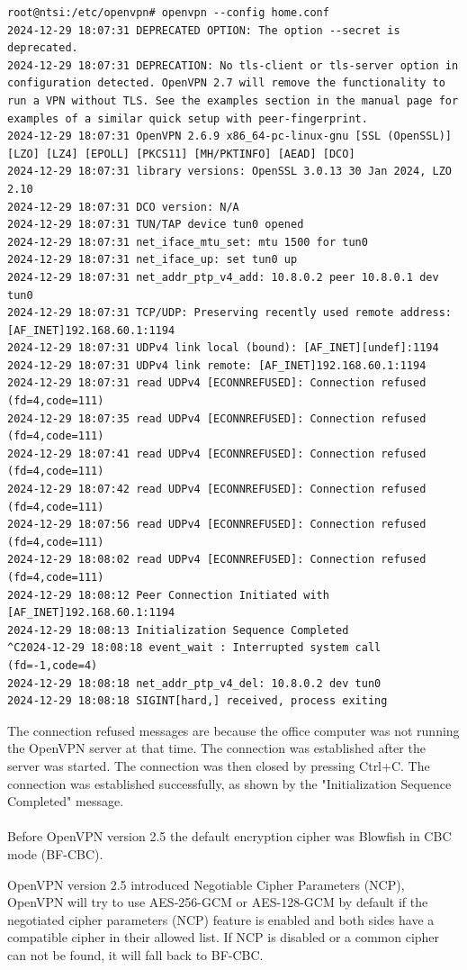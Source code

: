 \begin{verbatim}
root@ntsi:/etc/openvpn# openvpn --config home.conf
2024-12-29 18:07:31 DEPRECATED OPTION: The option --secret is deprecated.
2024-12-29 18:07:31 DEPRECATION: No tls-client or tls-server option in configuration detected. OpenVPN 2.7 will remove the functionality to run a VPN without TLS. See the examples section in the manual page for examples of a similar quick setup with peer-fingerprint.
2024-12-29 18:07:31 OpenVPN 2.6.9 x86_64-pc-linux-gnu [SSL (OpenSSL)] [LZO] [LZ4] [EPOLL] [PKCS11] [MH/PKTINFO] [AEAD] [DCO]
2024-12-29 18:07:31 library versions: OpenSSL 3.0.13 30 Jan 2024, LZO 2.10
2024-12-29 18:07:31 DCO version: N/A
2024-12-29 18:07:31 TUN/TAP device tun0 opened
2024-12-29 18:07:31 net_iface_mtu_set: mtu 1500 for tun0
2024-12-29 18:07:31 net_iface_up: set tun0 up
2024-12-29 18:07:31 net_addr_ptp_v4_add: 10.8.0.2 peer 10.8.0.1 dev tun0
2024-12-29 18:07:31 TCP/UDP: Preserving recently used remote address: [AF_INET]192.168.60.1:1194
2024-12-29 18:07:31 UDPv4 link local (bound): [AF_INET][undef]:1194
2024-12-29 18:07:31 UDPv4 link remote: [AF_INET]192.168.60.1:1194
2024-12-29 18:07:31 read UDPv4 [ECONNREFUSED]: Connection refused (fd=4,code=111)
2024-12-29 18:07:35 read UDPv4 [ECONNREFUSED]: Connection refused (fd=4,code=111)
2024-12-29 18:07:41 read UDPv4 [ECONNREFUSED]: Connection refused (fd=4,code=111)
2024-12-29 18:07:42 read UDPv4 [ECONNREFUSED]: Connection refused (fd=4,code=111)
2024-12-29 18:07:56 read UDPv4 [ECONNREFUSED]: Connection refused (fd=4,code=111)
2024-12-29 18:08:02 read UDPv4 [ECONNREFUSED]: Connection refused (fd=4,code=111)
2024-12-29 18:08:12 Peer Connection Initiated with [AF_INET]192.168.60.1:1194
2024-12-29 18:08:13 Initialization Sequence Completed
^C2024-12-29 18:08:18 event_wait : Interrupted system call (fd=-1,code=4)
2024-12-29 18:08:18 net_addr_ptp_v4_del: 10.8.0.2 dev tun0
2024-12-29 18:08:18 SIGINT[hard,] received, process exiting
\end{verbatim}

The connection refused messages are because the office computer was not running the OpenVPN server at that time. The connection was established after the server was started. The connection was then closed by pressing Ctrl+C. The connection was established successfully, as shown by the "Initialization Sequence Completed" message.
\\\\
Before OpenVPN version 2.5 the default encryption cipher was Blowfish in CBC mode (BF-CBC).

OpenVPN version 2.5 introduced Negotiable Cipher Parameters (NCP), OpenVPN will try to use AES-256-GCM or AES-128-GCM by default if the negotiated cipher parameters (NCP) feature is enabled and both sides have a compatible cipher in their allowed list. If NCP is disabled or a common cipher can not be found, it will fall back to BF-CBC.